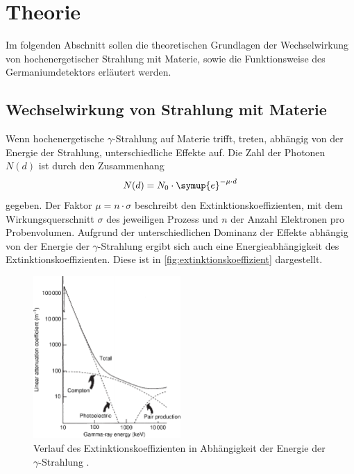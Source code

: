 \section{Theorie}
\label{sec:theorie}

Im folgenden Abschnitt sollen die theoretischen Grundlagen der Wechselwirkung von hochenergetischer Strahlung mit Materie,
sowie die Funktionsweise des Germaniumdetektors erläutert werden.

\subsection{Wechselwirkung von Strahlung mit Materie}
\label{sec:wechselwirkungen}

Wenn hochenergetische $\gamma$-Strahlung auf Materie trifft,
treten,
abhängig von der Energie der Strahlung,
unterschiedliche Effekte auf.
Die Zahl der Photonen $N(d)$ ist durch den Zusammenhang
\begin{equation}
    N(d) = N_0 \cdot \symup{e}^{-\mu \cdot d}
\end{equation}
gegeben.
Der Faktor $\mu = n \cdot \sigma$ beschreibt den Extinktionskoeffizienten,
mit dem Wirkungsquerschnitt $\sigma$ des jeweiligen Prozess und $n$ der Anzahl Elektronen pro Probenvolumen.
Aufgrund der unterschiedlichen Dominanz der Effekte abhängig von der Energie der $\gamma$-Strahlung ergibt sich auch eine Energieabhängigkeit des Extinktionskoeffizienten.
Diese ist in \autoref{fig:extinktionskoeffizient} dargestellt.
\begin{figure}
    \centering
    \includegraphics[width=0.5\textwidth]{content/img/Gilmore_Abb_2.3.pdf}
    \caption{Verlauf des Extinktionskoeffizienten in Abhängigkeit der Energie der $\gamma$-Strahlung \cite{gilmore}.}
    \label{fig:extinktionskoeffizient}
\end{figure}

